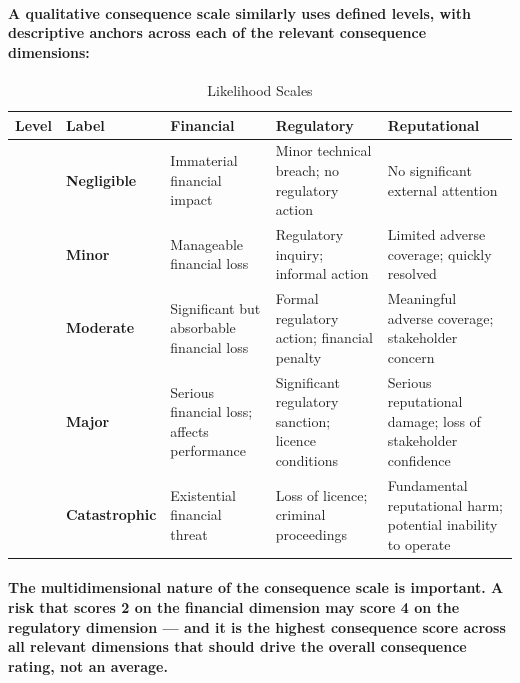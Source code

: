 \paragraph{A qualitative consequence scale similarly uses defined levels, with descriptive anchors across each of the relevant consequence dimensions:}
\begin{table}[H]
  \centering
  \renewcommand{\arraystretch}{1.5}
  \begin{tabularx}{\textwidth}{ | >{\raggedright\arraybackslash}p{} 
								| >{\raggedright\arraybackslash}p{} 
								| >{\raggedright\arraybackslash}p{} 
								| >{\raggedright\arraybackslash}p{} 
                                | >{\raggedright\arraybackslash}X | }
    \hline
    \textbf{Level} & \textbf{Label} & \textbf{Financial} & \textbf{Regulatory} & \textbf{Reputational} \\
    \hline
    1 & \textbf{Negligible} & Immaterial financial impact & Minor technical breach; no regulatory action & No significant external attention\\
    \hline
    2 & \textbf{Minor} & Manageable financial loss & Regulatory inquiry; informal action & Limited adverse coverage; quickly resolved\\
    \hline
    3 & \textbf{Moderate} & Significant but absorbable financial loss & Formal regulatory action; financial penalty & Meaningful adverse coverage; stakeholder concern\\
    \hline
    4 & \textbf{Major} & Serious financial loss; affects performance & Significant regulatory sanction; licence conditions & Serious reputational damage; loss of stakeholder confidence\\
    \hline
    5 & \textbf{Catastrophic} & Existential financial threat & Loss of licence; criminal proceedings & Fundamental reputational harm; potential inability to operate\\
    \hline
  \end{tabularx}
  \caption{Likelihood Scales}
\end{table}
\paragraph{The multidimensional nature of the consequence scale is important. A risk that scores 2 on the financial dimension may score 4 on the regulatory dimension — and it is the highest consequence score across all relevant dimensions that should drive the overall consequence rating, not an average.}

